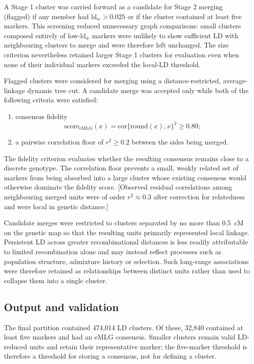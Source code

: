 \documentclass[11pt]{article}
\begin{document}
A Stage 1 cluster was carried forward as a candidate for Stage 2 merging (flagged) if any member had \(\mathrm{ld}_w>0.025\) or if the cluster contained at least five markers. This screening reduced unnecessary graph comparisons: small clusters composed entirely of low-\(\mathrm{ld}_w\) markers were unlikely to show sufficient LD with neighbouring clusters to merge and were therefore left unchanged. The size criterion nevertheless retained larger Stage 1 clusters for evaluation even when none of their individual markers exceeded the local-LD threshold.

Flagged clusters were considered for merging using a distance-restricted, average-linkage dynamic tree cut. A candidate merge was accepted only while both of the following criteria were satisfied:
\begin{enumerate}
  \item consensus fidelity
  \[
    \mathrm{score}_{\mathrm{eMLG}}(x)
    =\mathrm{cor}\{\mathrm{round}(x),x\}^{2} \geq 0.80;
  \]
  \item a pairwise correlation floor of \(r^2\geq0.2\) between the sides being
        merged.
\end{enumerate}

The fidelity criterion evaluates whether the resulting consensus remains close to a discrete genotype. The correlation floor prevents a small, weakly related set of markers from being absorbed into a large cluster whose existing consensus would otherwise dominate the fidelity score. [Observed residual correlations among neighbouring merged units were of order \(r^2\approx0.3\) after correction for relatedness and were local in genetic distance.]

Candidate merges were restricted to clusters separated by no more than 0.5~cM on the genetic map so that the resulting units primarily represented local linkage. Persistent LD across greater recombinational distances is less readily attributable to limited recombination alone and may instead reflect processes such as population structure, admixture history or selection. Such long-range associations were therefore retained as relationships between distinct units rather than used to collapse them into a single cluster.

\subsection*{Output and validation}

The final partition contained 474,014 LD clusters. Of these, 32,840 contained at least five markers and had an eMLG consensus. Smaller clusters remain valid LD-reduced units and retain their representative marker; the five-marker threshold is therefore a threshold for storing a consensus, not for defining a cluster.
\end{document}
